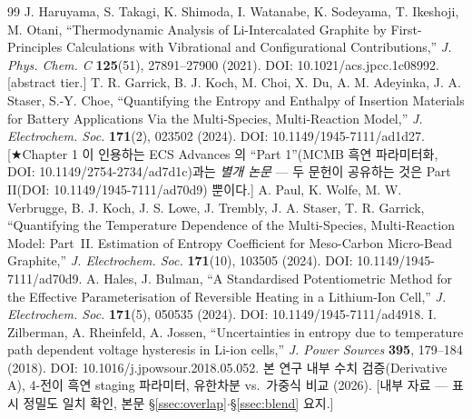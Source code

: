 \begin{thebibliography}{99}
 J. Haruyama, S. Takagi, K. Shimoda, I. Watanabe, K. Sodeyama, T. Ikeshoji, M. Otani, ``Thermodynamic Analysis of Li-Intercalated Graphite by First-Principles Calculations with Vibrational and Configurational Contributions,'' \emph{J. Phys. Chem. C} \textbf{125}(51), 27891--27900 (2021). DOI: 10.1021/acs.jpcc.1c08992. [abstract tier.]
 T. R. Garrick, B. J. Koch, M. Choi, X. Du, A. M. Adeyinka, J. A. Staser, S.-Y. Choe, ``Quantifying the Entropy and Enthalpy of Insertion Materials for Battery Applications Via the Multi-Species, Multi-Reaction Model,'' \emph{J. Electrochem. Soc.} \textbf{171}(2), 023502 (2024). DOI: 10.1149/1945-7111/ad1d27. [★Chapter 1 이 인용하는 ECS Advances 의 ``Part 1''(MCMB 흑연 파라미터화, DOI: 10.1149/2754-2734/ad7d1c)과는 \emph{별개 논문} --- 두 문헌이 공유하는 것은 Part II(DOI: 10.1149/1945-7111/ad70d9) 뿐이다.]
 A. Paul, K. Wolfe, M. W. Verbrugge, B. J. Koch, J. S. Lowe, J. Trembly, J. A. Staser, T. R. Garrick, ``Quantifying the Temperature Dependence of the Multi-Species, Multi-Reaction Model: Part~II. Estimation of Entropy Coefficient for Meso-Carbon Micro-Bead Graphite,'' \emph{J. Electrochem. Soc.} \textbf{171}(10), 103505 (2024). DOI: 10.1149/1945-7111/ad70d9.
 A. Hales, J. Bulman, ``A Standardised Potentiometric Method for the Effective Parameterisation of Reversible Heating in a Lithium-Ion Cell,'' \emph{J. Electrochem. Soc.} \textbf{171}(5), 050535 (2024). DOI: 10.1149/1945-7111/ad4918.
 I. Zilberman, A. Rheinfeld, A. Jossen, ``Uncertainties in entropy due to temperature path dependent voltage hysteresis in Li-ion cells,'' \emph{J. Power Sources} \textbf{395}, 179--184 (2018). DOI: 10.1016/j.jpowsour.2018.05.052.
 본 연구 내부 수치 검증(Derivative A),  4-전이 흑연 staging 파라미터, 유한차분 vs.\ 가중식 비교 (2026). [내부 자료 --- 표시 정밀도 일치 확인, 본문 \S\ref{ssec:overlap}$\cdot$\S\ref{ssec:blend} 요지.]
\end{thebibliography}

